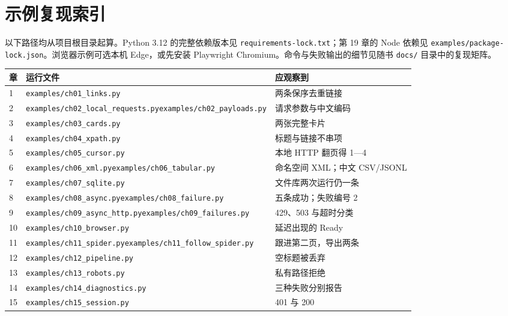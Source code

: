 \chapter{示例复现索引}\label{app:repro}
以下路径均从项目根目录起算。Python 3.12 的完整依赖版本见 \texttt{requirements-lock.txt}；第 19 章的 Node 依赖见 \texttt{examples/package-lock.json}。浏览器示例可选本机 Edge，或先安装 Playwright Chromium。命令与失败输出的细节见随书 \texttt{docs/} 目录中的复现矩阵。

\begingroup\small
\begin{longtable}{@{}p{}p{}p{}@{}}
\toprule
章 & 运行文件 & 应观察到\\
\midrule\endhead
1 & \texttt{examples/ch01\_links.py} & 两条保序去重链接\\
2 & \texttt{examples/ch02\_local\_requests.py}\newline\texttt{examples/ch02\_payloads.py} & 请求参数与中文编码\\
3 & \texttt{examples/ch03\_cards.py} & 两张完整卡片\\
4 & \texttt{examples/ch04\_xpath.py} & 标题与链接不串项\\
5 & \texttt{examples/ch05\_cursor.py} & 本地 HTTP 翻页得 1—4\\
6 & \texttt{examples/ch06\_xml.py}\newline\texttt{examples/ch06\_tabular.py} & 命名空间 XML；中文 CSV/JSONL\\
7 & \texttt{examples/ch07\_sqlite.py} & 文件库两次运行仍一条\\
8 & \texttt{examples/ch08\_async.py}\newline\texttt{examples/ch08\_failure.py} & 五条成功；失败编号 2\\
9 & \texttt{examples/ch09\_async\_http.py}\newline\texttt{examples/ch09\_failures.py} & 429、503 与超时分类\\
10 & \texttt{examples/ch10\_browser.py} & 延迟出现的 Ready\\
11 & \texttt{examples/ch11\_spider.py}\newline\texttt{examples/ch11\_follow\_spider.py} & 跟进第二页，导出两条\\
12 & \texttt{examples/ch12\_pipeline.py} & 空标题被丢弃\\
13 & \texttt{examples/ch13\_robots.py} & 私有路径拒绝\\
14 & \texttt{examples/ch14\_diagnostics.py} & 三种失败分别报告\\
15 & \texttt{examples/ch15\_session.py} & 401 与 200\\

\end{longtable}

